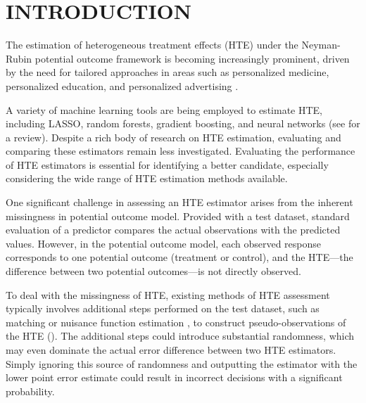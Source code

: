 \documentclass[twoside]{article}
\newcommand{\1}{{\mathbbm{1}}}
\begin{document}
\section{INTRODUCTION}\label{sec:introduction}

The estimation of heterogeneous treatment effects (HTE) under the Neyman-Rubin potential outcome framework is becoming increasingly prominent, driven by the need for tailored approaches in areas such as personalized medicine, personalized education, and personalized advertising 
\parencite{splawa1990application, low2016comparing, lesko2007personalized, murphy2016handbook, bennett2007netflix}. 
 
A variety of machine learning tools are being employed to estimate HTE, including LASSO, random forests, gradient boosting, and neural networks (see \cite{Kunzel4156} for a review).
Despite a rich body of research on HTE estimation, evaluating and comparing these estimators remain less investigated.
Evaluating the performance of HTE estimators is essential for identifying a better candidate, especially considering the wide range of HTE estimation methods available.


One significant challenge in assessing an HTE estimator arises from the inherent missingness in potential outcome model.
Provided with a test dataset, standard evaluation of a predictor compares the actual observations with the predicted values.
However, in the potential outcome model, each observed response corresponds to one potential outcome (treatment or control), and the HTE---the difference between two potential outcomes---is not directly observed.


To deal with the missingness of HTE, existing methods of HTE assessment typically involves additional steps performed on the test dataset, such as matching \parencite{rolling2014model} or nuisance function estimation \parencite{alaa2019validating}, to construct pseudo-observations of the HTE (). 
The additional steps could introduce substantial randomness, which may even dominate the actual error difference between two HTE estimators.
Simply ignoring this source of randomness and outputting the estimator with the lower point error estimate could result in incorrect decisions with a significant probability.
\end{document}
